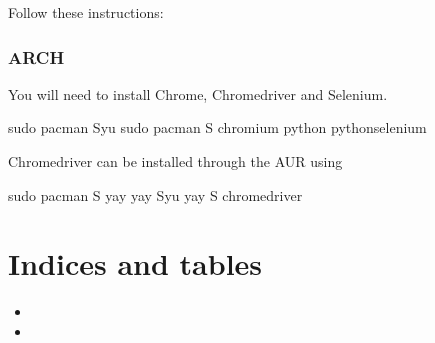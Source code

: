 \documentclass[letterpaper,10pt,english]{sphinxmanual}
\begin{document}
Follow these instructions: 


\subsection{ARCH}
\label{\detokenize{index:arch}}
You will need to install Chrome, Chromedriver and Selenium.

\begin{sphinxVerbatim}[commandchars=\\\{\}]
\PYGZdl{} sudo pacman \PYGZhy{}Syu
\PYGZdl{} sudo pacman \PYGZhy{}S chromium python python\PYGZhy{}selenium
\end{sphinxVerbatim}

Chromedriver can be installed through the AUR using 

\begin{sphinxVerbatim}[commandchars=\\\{\}]
\PYGZdl{} sudo pacman \PYGZhy{}S yay
\PYGZdl{} yay \PYGZhy{}Syu
\PYGZdl{} yay \PYGZhy{}S chromedriver
\end{sphinxVerbatim}


\chapter{Indices and tables}
\label{\detokenize{index:indices-and-tables}}\begin{itemize}
\item {} 

\item {} 

\end{itemize}



\renewcommand{\indexname}{Index}
\printindex
\end{document}
